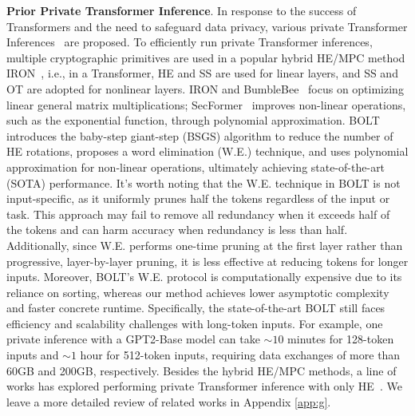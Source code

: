 \noindent\textbf{Prior Private Transformer Inference}. In response to the success of Transformers and the need to safeguard data privacy, various private Transformer Inferences~\citep{chen2022thex,zheng2023primer,hao2022iron-iron,li2022mpcformer, lu2023bumblebee, hou2023ciphergpt, luo2024secformer, pang2023bolt}  are proposed. To efficiently run private Transformer inferences, multiple cryptographic primitives are used in a popular hybrid HE/MPC method IRON~\citep{hao2022iron-iron}, i.e., in a Transformer, HE and SS are used for linear layers, and SS and OT are adopted for nonlinear layers. IRON and BumbleBee~\citep{lu2023bumblebee} focus on optimizing linear general matrix multiplications; {SecFormer~\citep{luo2024secformer} improves non-linear operations, such as the exponential function, through polynomial approximation.} BOLT~\citep{pang2023bolt} introduces the baby-step giant-step (BSGS) algorithm to reduce the number of HE rotations, proposes a word elimination (W.E.) technique, and uses polynomial approximation for non-linear operations, ultimately achieving state-of-the-art (SOTA) performance. It’s worth noting that the W.E. technique in BOLT is not input-specific, as it uniformly prunes half the tokens regardless of the input or task. This approach may fail to remove all redundancy when it exceeds half of the tokens and can harm accuracy when redundancy is less than half. Additionally, since W.E. performs one-time pruning at the first layer rather than progressive, layer-by-layer pruning, it is less effective at reducing tokens for longer inputs. Moreover, BOLT's W.E. protocol is computationally expensive due to its reliance on sorting, whereas our method achieves lower asymptotic complexity and faster concrete runtime. Specifically, the state-of-the-art BOLT still faces efficiency and scalability challenges with long-token inputs. For example, one private inference with a GPT2-Base model can take $\sim10$ minutes for 128-token inputs and $\sim1$ hour for 512-token inputs, requiring data exchanges of more than 60GB and 200GB, respectively. {Besides the hybrid HE/MPC methods, a line of works has explored performing private Transformer inference with only HE~\citep{zimerman2023converting, zhang2024nonin}}. {We leave a more detailed review of related works in Appendix \ref{app:g}.}

